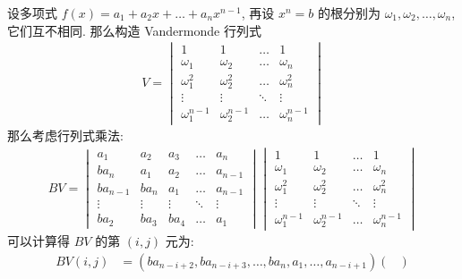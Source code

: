 \begin{exercise}[series=exer]
\begin{hint}
    \end{hint}
    \begin{answer}
        设多项式 $ f(x) = a_{1} + a_{2}x + \dots + a_{n}x^{n-1} $, 再设 $ x^{n} = b $ 的根分别为 $ \omega_{1}, \omega_{2}, \dots, \omega_{n} $, 它们互不相同. 那么构造 Vandermonde 行列式
        \begin{align*}
            V = \begin{vmatrix}
                1 & 1 & \dots & 1\\
                \omega_{1} & \omega_{2} & \dots & \omega_{n}\\
                \omega_{1}^{2} & \omega_{2}^{2} & \dots & \omega_{n}^{2}\\
                \vdots & \vdots & \ddots & \vdots\\
                \omega_{1}^{n-1} & \omega_{2}^{n-1} & \dots & \omega_{n}^{n-1}
            \end{vmatrix}
        \end{align*}
        那么考虑行列式乘法:
        \begin{align*}
            BV = 
            \begin{vmatrix}
                a_{1}   & a_{2} & a_{3} & \ldots    & a_{n} \\
                ba_{n}  & a_{1} & a_{2} & \ldots    & a_{n-1} \\
                ba_{n-1}    & ba_{n}    & a_{1} & \ldots & a_{n-1} \\
                \vdots  & \vdots & \vdots & \ddots & \vdots \\
                ba_{2} & ba_{3} & ba_{4} & \ldots & a_{1}
            \end{vmatrix}
            \begin{vmatrix}
                1 & 1 & \dots & 1\\
                \omega_{1} & \omega_{2} & \dots & \omega_{n}\\
                \omega_{1}^{2} & \omega_{2}^{2} & \dots & \omega_{n}^{2}\\
                \vdots & \vdots & \ddots & \vdots\\
                \omega_{1}^{n-1} & \omega_{2}^{n-1} & \dots & \omega_{n}^{n-1}
            \end{vmatrix}
        \end{align*}
        可以计算得 $ BV $ 的第 $ (i, j) $ 元为:
        \begin{align*}
            BV(i, j) & = (ba_{n-i+2}, ba_{n-i+3}, \dots, ba_{n}, a_{1}, \dots, a_{n-i+1})\begin{pmatrix}

\end{pmatrix}
\end{align*}
\end{answer}
\end{exercise}
